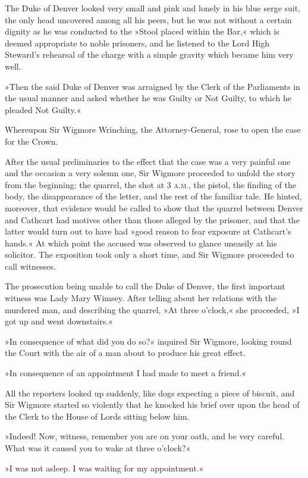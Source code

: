 The Duke of Denver looked very small and pink and lonely in his blue serge suit, the only head uncovered among all his peers, but he was not without a certain dignity as he was conducted to the »Stool placed within the Bar,« which is deemed appropriate to noble prisoners, and he listened to the Lord High Steward's rehearsal of the charge with a simple gravity which became him very well.

»Then the said Duke of Denver was arraigned by the Clerk of the Parliaments in the usual manner and asked whether he was Guilty or Not Guilty, to which he pleaded Not Guilty.«

Whereupon Sir Wigmore Wrinching, the Attorney-General, rose to open the case for the Crown.

After the usual preliminaries to the effect that the case was a very painful one and the occasion a very solemn one, Sir Wigmore proceeded to unfold the story from the beginning: the quarrel, the shot at 3 \textsc{a.m.}, the pistol, the finding of the body, the disappearance of the letter, and the rest of the familiar tale. He hinted, moreover, that evidence would be called to show that the quarrel between Denver and Cathcart had motives other than those alleged by the prisoner, and that the latter would turn out to have had »good reason to fear exposure at Cathcart's hands.« At which point the accused was observed to glance uneasily at his solicitor. The exposition took only a short time, and Sir Wigmore proceeded to call witnesses.

The prosecution being unable to call the Duke of Denver, the first important witness was Lady Mary Wimsey. After telling about her relations with the murdered man, and describing the quarrel, »At three o'clock,« she proceeded, »I got up and went downstairs.«

»In consequence of what did you do so?« inquired Sir Wigmore, looking round the Court with the air of a man about to produce his great effect.

»In consequence of an appointment I had made to meet a friend.«

All the reporters looked up suddenly, like dogs expecting a piece of biscuit, and Sir Wigmore started so violently that he knocked his brief over upon the head of the Clerk to the House of Lords sitting below him.

»Indeed! Now, witness, remember you are on your oath, and be very careful. What was it caused you to wake at three o'clock?«

»I was not asleep. I was waiting for my appointment.«

